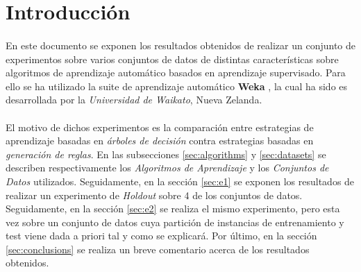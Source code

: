 \documentclass{article}
\begin{document}
	\maketitle %

	\thispagestyle{fancy} %



	\begin{abstract}
		\noindent [TODO]
	\end{abstract}



	\section{Introducción}
	\label{sec:introducción}

		\paragraph{}
		En este documento se exponen los resultados obtenidos de realizar un conjunto de experimentos sobre varios conjuntos de datos de distintas características sobre algoritmos de aprendizaje automático basados en aprendizaje supervisado. Para ello se ha utilizado la suite de aprendizaje automático \textbf{Weka} \cite{tool:weka}, la cual ha sido es desarrollada por la \emph{Universidad de Waikato}, Nueva Zelanda.

		\paragraph{}
		El motivo de dichos experimentos es la comparación entre estrategias de aprendizaje basadas en \emph{árboles de decisión} contra estrategias basadas en \emph{generación de reglas}. En las subsecciones \ref{sec:algorithms} y \ref{sec:datasets} se describen respectivamente los \emph{Algoritmos de Aprendizaje} y los \emph{Conjuntos de Datos} utilizados. Seguidamente, en la sección \ref{sec:e1} se exponen los resultados de realizar un experimento de \emph{Holdout} sobre 4 de los conjuntos de datos. Seguidamente, en la sección \ref{sec:e2} se realiza el mismo experimento, pero esta vez sobre un conjunto de datos cuya partición de instancias de entrenamiento y test viene dada a priori tal y como se explicará. Por último, en la sección \ref{sec:conclusions} se realiza un breve comentario acerca de los resultados obtenidos.
\end{document}
